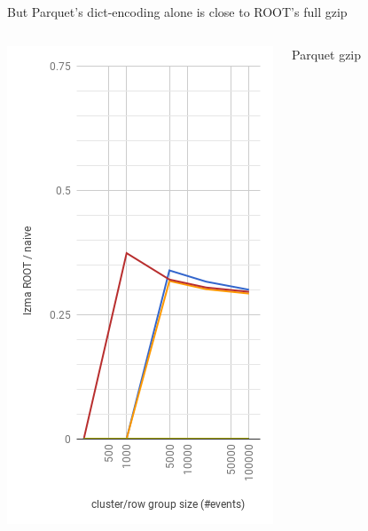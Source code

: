 \documentclass[aspectratio=169]{beamer}
\begin{document}
\begin{frame}{But Parquet's dict-encoding alone is close to ROOT's full gzip}
\begin{columns}
\begin{center}
\includegraphics[width=\linewidth]{root-lzma.png}
\end{center}
\begin{center}
\mbox{\hspace{3 cm}}
Parquet gzip


\end{center}
\end{columns}
\end{frame}
\end{document}
